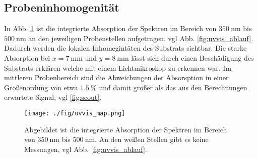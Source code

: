 \subsection{Probeninhomogenität}
In Abb. \ref{fig:uvvis_map} ist die integrierte Absorption der Spektren im Bereich von $\SI{350}{\nm}$ bis $\SI{500}{\nm}$ an den jeweiligen Probenstellen aufgetragen, vgl Abb. \ref{fig:uvvis_ablauf}.
Dadurch werden die lokalen Inhomegintäten des Substrats sichtbar.
Die starke Absorption bei $x=\SI{7}{\mm}$ und $y=\SI{8}{\mm}$ lässt sich durch einen Beschädigung des Substrats erklären welche mit einem Lichtmikroskop zu erkennen war.
Im mittleren Probenbereich sind die Abweichungen der Absorsption in einer Größenordung von etwa $\SI{1.5}{\%}$ und damit größer als das aus den Berechnungen erwartete Signal, vgl \ref{fig:scout}.
\begin{figure}
    \centering
    \texttt{[image: ./fig/uvvis\_map.png]}
    \caption{Abgebildet ist die integrierte Absorption der Spektren im Bereich von $\SI{350}{\nm}$ bis $\SI{500}{\nm}$. An den weißen Stellen gibt es keine Messungen, vgl Abb. \ref{fig:uvvis_ablauf}.}
    \label{fig:uvvis_map}
\end{figure}






